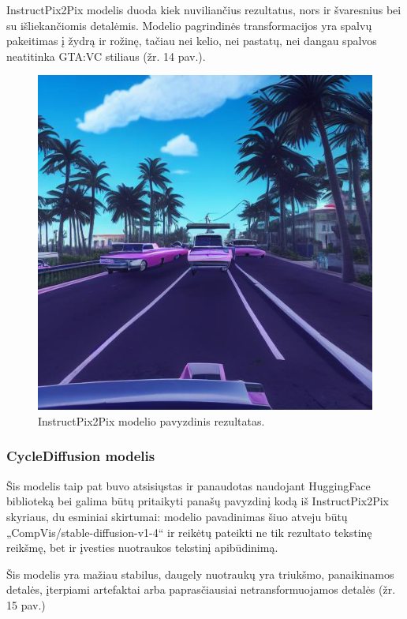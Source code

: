 \documentclass{VUMIFPSbakalaurinis}
\begin{document}
            InstructPix2Pix modelis duoda kiek nuviliančius rezultatus, nors ir švaresnius bei su išliekančiomis detalėmis. Modelio pagrindinės transformacijos yra spalvų pakeitimas į žydrą ir rožinę, tačiau nei kelio, nei pastatų, nei dangau spalvos neatitinka GTA:VC stiliaus (žr. 14 pav.). 

            \begin{figure}[H]
                \centering
                \includegraphics[scale=0.7]{img/diffusion/instruct/512}
                \caption{InstructPix2Pix modelio pavyzdinis rezultatas.}
                \label{img:mlp}
            \end{figure}

        \subsubsection{CycleDiffusion modelis}
            Šis modelis taip pat buvo atsisiųstas ir panaudotas naudojant HuggingFace biblioteką bei galima būtų pritaikyti panašų pavyzdinį kodą iš InstructPix2Pix skyriaus, du esminiai skirtumai: modelio pavadinimas šiuo atveju būtų „CompVis/stable-diffusion-v1-4“ ir reikėtų pateikti ne tik rezultato tekstinę reikšmę, bet ir įvesties nuotraukos tekstinį apibūdinimą.

            Šis modelis yra mažiau stabilus, daugely nuotraukų yra triukšmo, panaikinamos detalės, įterpiami artefaktai arba paprasčiausiai netransformuojamos detalės (žr. 15 pav.)
\end{document}
